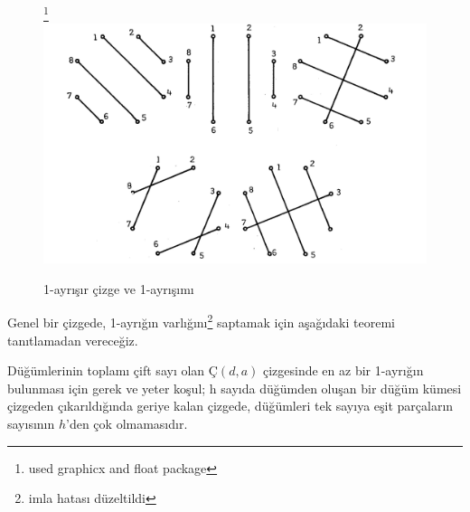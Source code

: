 \documentclass{amsbook}
\begin{document}
    \begin{figure}[H]
    \footnote{used graphicx and float package}
      \centering
          \includegraphics[width=1\textwidth]{images/ceyhun-218-fig01}
      \caption{1-ayrışır çizge ve 1-ayrışımı}
    \end{figure}
    Genel bir çizgede, 1-ayrığın varlığını\footnote{imla hatası düzeltildi} saptamak için aşağıdaki teoremi tanıtlamadan vereceğiz.
    \begin{theorem}
    Düğümlerinin toplamı çift sayı olan $Ç(d, a)$ çizgesinde en az bir 1-ayrığın bulunması için gerek ve yeter koşul; h sayıda düğümden oluşan bir düğüm kümesi çizgeden çıkarıldığında geriye kalan çizgede, düğümleri tek sayıya eşit parçaların sayısının $h$'den çok olmamasıdır.
    \end{theorem}
\end{document}

